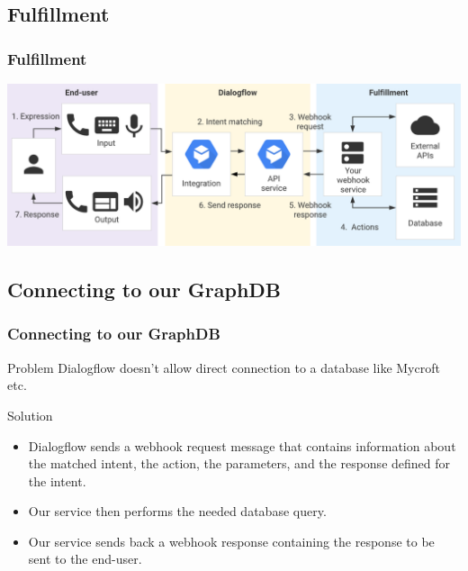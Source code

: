 \documentclass{beamer}
\begin{document}

\subsection{Fulfillment}

\begin{frame}
\frametitle{Fulfillment}
\begin{center}
\includegraphics[width=\textwidth]{pictures/fulfillment_flow.png} 
\end{center}
\end{frame}


\subsection{Connecting to our GraphDB}

\begin{frame}
\frametitle{Connecting to our GraphDB}
\begin{block}{Problem}
Dialogflow doesn't allow direct connection to a database like Mycroft etc.
\end{block}


\begin{block}{Solution}
\begin{itemize}
\item Dialogflow sends a webhook request message that contains information about the matched intent, the action, the parameters, and the response defined for the intent.
\item Our service then performs the needed database query.
\item Our service sends back a webhook response containing the response to be sent to the end-user.
\end{itemize}
\end{block}

\end{frame}
\end{document}
